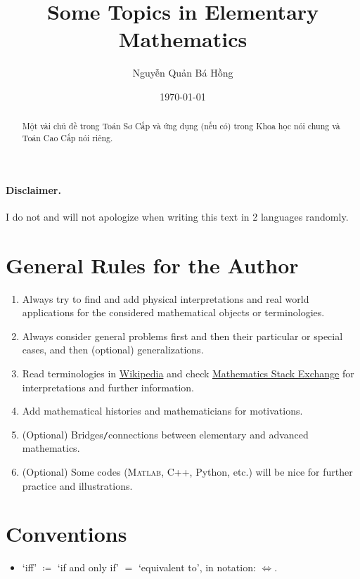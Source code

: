 \documentclass{article}
\title{Some Topics in Elementary Mathematics}
\author{Nguyễn Quản Bá Hồng}
\date{\today}
\numberwithin{equation}{section}
\begin{document}
\maketitle
\begin{abstract}
	Một vài chủ đề trong Toán Sơ Cấp và ứng dụng (nếu có) trong Khoa học nói chung và Toán Cao Cấp nói riêng.
\end{abstract}
\tableofcontents


\paragraph{Disclaimer.} I do not and will not apologize when writing this text in 2 languages randomly.

\section*{General Rules for the Author}
\begin{enumerate}
	\item Always try to find and add physical interpretations and real world applications for the considered mathematical objects or terminologies.
	\item Always consider general problems first and then their particular or special cases, and then (optional) generalizations.
	\item Read terminologies in \href{https://www.wikipedia.org/}{Wikipedia} and check \href{https://math.stackexchange.com/}{Mathematics Stack Exchange} for interpretations and further information.
	\item Add mathematical histories and mathematicians for motivations.
	\item (Optional) Bridges\texttt{/}connections between elementary and advanced mathematics.
	\item (Optional) Some codes (\textsc{Matlab}, C++, Python, etc.) will be nice for further practice and illustrations.
\end{enumerate}

\section*{Conventions}
\begin{itemize}
	\item `iff' $\coloneqq$ `if and only if' $=$ `equivalent to', in notation: $\Leftrightarrow$.
\end{itemize}
\end{document}
